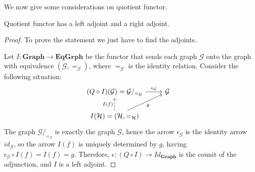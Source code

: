 We now give some considerations on quotient functor.

\begin{prop}
    Quotient functor has a left adjoint and a right adjoint.
\end{prop}

\begin{proof}
    To prove the statement we just have to find the adjoints. 

     Let $I: \mathbf{Graph \rightarrow EqGrph}$ be the functor
     that sends each graph $\mathcal{G}$ onto the graph with equivalence $(\mathcal{G}, =_{\mathcal{G}})$, where $=_{\mathcal G}$ is the identity relation.
    Consider the following situation:
    \[
        \begin{tikzcd}
            (Q \circ I)(\mathcal{G}) = \mathcal{G}/_{=_{\mathcal{G}}}
            \arrow[r, "{\epsilon_{\mathcal{G}}}"] 
            & \mathcal{G} \\
            {I(\mathcal{H}) = (\mathcal{H}, =_{\mathcal{H}})}
            \arrow[u, dashed, "I(f)"] 
            \arrow[ur, "g"swap] 
        \end{tikzcd}
    \]
    The graph $\mathcal G/_{=_{\mathcal{G}}}$ is exactly the graph $\mathcal G$, hence the arrow $\epsilon_\mathcal{G}$ is the identity arrow $id_\mathcal{G}$, so the arrow $I(f)$ is uniquely determined by $g$, having $\epsilon_{\mathcal{G}} \circ I(f) = I(f) = g$. Therefore, $\epsilon: (Q \circ I) \rightarrow Id_{\mathbf{Graph}}$ is the counit of the adjunction, and $I$ is a left adjoint.


\end{proof}
